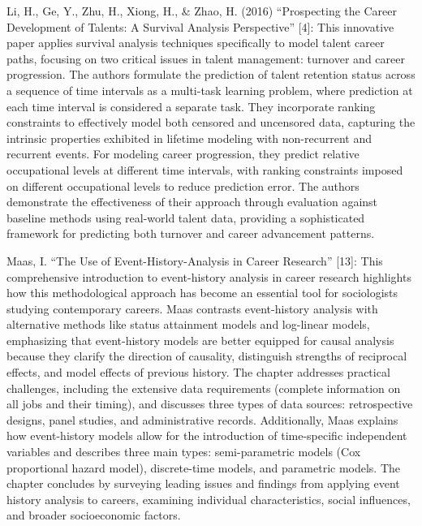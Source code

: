 \documentclass[
  letterpaper,
  DIV=11,
  numbers=noendperiod]{scrartcl}
\begin{document}
Li, H., Ge, Y., Zhu, H., Xiong, H., \& Zhao, H. (2016) ``Prospecting the
Career Development of Talents: A Survival Analysis Perspective''
{[}4{]}: This innovative paper applies survival analysis techniques
specifically to model talent career paths, focusing on two critical
issues in talent management: turnover and career progression. The
authors formulate the prediction of talent retention status across a
sequence of time intervals as a multi-task learning problem, where
prediction at each time interval is considered a separate task. They
incorporate ranking constraints to effectively model both censored and
uncensored data, capturing the intrinsic properties exhibited in
lifetime modeling with non-recurrent and recurrent events. For modeling
career progression, they predict relative occupational levels at
different time intervals, with ranking constraints imposed on different
occupational levels to reduce prediction error. The authors demonstrate
the effectiveness of their approach through evaluation against baseline
methods using real-world talent data, providing a sophisticated
framework for predicting both turnover and career advancement patterns.

Maas, I. ``The Use of Event-History-Analysis in Career Research''
{[}13{]}: This comprehensive introduction to event-history analysis in
career research highlights how this methodological approach has become
an essential tool for sociologists studying contemporary careers. Maas
contrasts event-history analysis with alternative methods like status
attainment models and log-linear models, emphasizing that event-history
models are better equipped for causal analysis because they clarify the
direction of causality, distinguish strengths of reciprocal effects, and
model effects of previous history. The chapter addresses practical
challenges, including the extensive data requirements (complete
information on all jobs and their timing), and discusses three types of
data sources: retrospective designs, panel studies, and administrative
records. Additionally, Maas explains how event-history models allow for
the introduction of time-specific independent variables and describes
three main types: semi-parametric models (Cox proportional hazard
model), discrete-time models, and parametric models. The chapter
concludes by surveying leading issues and findings from applying event
history analysis to careers, examining individual characteristics,
social influences, and broader socioeconomic factors.
\end{document}
